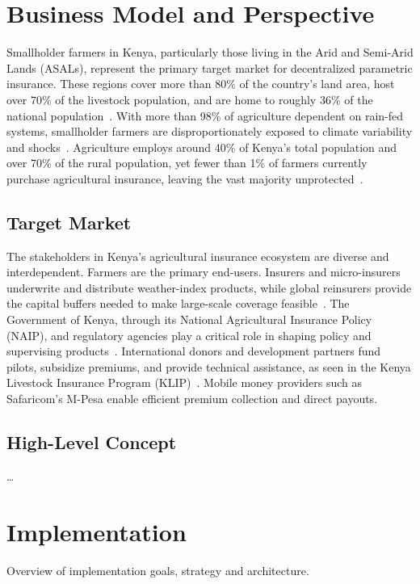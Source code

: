 \documentclass[11pt,a4paper]{article}
\begin{document}
	\section{Business Model and Perspective}\label{sec:business-model}
	Smallholder farmers in Kenya, particularly those living in the Arid and Semi-Arid Lands (ASALs), represent the primary target market for decentralized parametric insurance.
	These regions cover more than 80\% of the country’s land area, host over 70\% of the livestock population, and are home to roughly 36\% of the national population~\parencite{IUCN2021,UNEPDHI2021}.
	With more than 98\% of agriculture dependent on rain-fed systems, smallholder farmers are disproportionately exposed to climate variability and shocks~\parencite{GoK2017}.
	Agriculture employs around 40\% of Kenya’s total population and over 70\% of the rural population, yet fewer than 1\% of farmers currently purchase agricultural insurance, leaving the vast majority unprotected~\parencite{FAO2024b,MoA2023}.

	\subsection{Target Market}\label{subsec:target-market}
	The stakeholders in Kenya’s agricultural insurance ecosystem are diverse and interdependent.
	Farmers are the primary end-users.
	Insurers and micro-insurers underwrite and distribute weather-index products, while global reinsurers provide the capital buffers needed to make large-scale coverage feasible~\parencite{Artemis2017,BASIS2017}.
	The Government of Kenya, through its National Agricultural Insurance Policy (NAIP), and regulatory agencies play a critical role in shaping policy and supervising products~\parencite{AfricanClimate2024,MoA2023}.
	International donors and development partners fund pilots, subsidize premiums, and provide technical assistance, as seen in the Kenya Livestock Insurance Program (KLIP)~\parencite{WorldBank2022}.
	Mobile money providers such as Safaricom’s M-Pesa enable efficient premium collection and direct payouts\parencite{Oxford2017}.

	\subsection{High-Level Concept}\label{subsec:high-level-concept}
	\ldots

	\section{Implementation}\label{sec:implementation}
	Overview of implementation goals, strategy and architecture.
\end{document}
